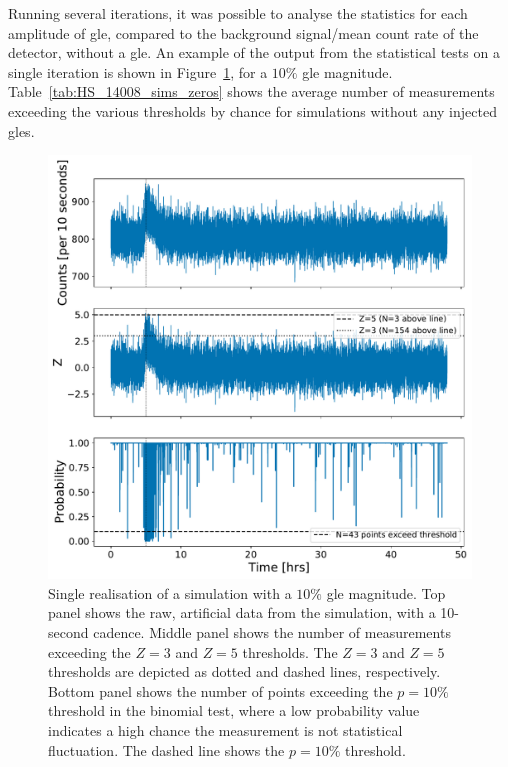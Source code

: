 Running several iterations, it was possible to analyse the statistics for each amplitude of \gls{gle}, compared to the background signal/mean count rate of the detector, without a \gls{gle}. An example of the output from the statistical tests on a single iteration is shown in Figure~\ref{fig:simulated_data_stats}, for a $10 \%$ \gls{gle} magnitude. Table~\ref{tab:HS_14008_sims_zeros} shows the average number of measurements exceeding the various thresholds by chance for simulations without any injected \glspl{gle}.


\begin{figure}[ht!]
	\centering
	\includegraphics[width=0.9\columnwidth]{simulated_data_stats.pdf}
	\caption{Single realisation of a simulation with a $10\%$ \gls{gle} magnitude. Top panel shows the raw, artificial data from the simulation, with a 10-second cadence. Middle panel shows the number of measurements exceeding the $Z=3$ and $Z=5$ thresholds. The $Z=3$ and $Z=5$ thresholds are depicted as dotted and dashed lines, respectively. Bottom panel shows the number of points exceeding the $p = 10 \%$ threshold in the binomial test, where a low probability value indicates a high chance the measurement is not statistical fluctuation. The dashed line shows the $p = 10 \%$ threshold.}
	\label{fig:simulated_data_stats}
\end{figure}

\vspace{1em}

